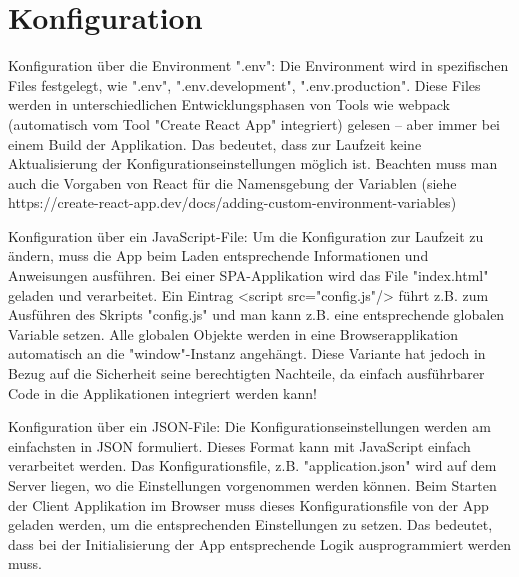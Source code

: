 \section{Konfiguration}

Konfiguration über die Environment ".env": Die Environment wird in spezifischen Files festgelegt, wie ".env", ".env.development", ".env.production". Diese Files werden in unterschiedlichen Entwicklungsphasen von Tools wie webpack (automatisch vom Tool "Create React App" integriert) gelesen – aber immer bei einem Build der Applikation. Das bedeutet, dass zur Laufzeit keine Aktualisierung der Konfigurationseinstellungen möglich ist. Beachten muss man auch die Vorgaben von React für die Namensgebung der Variablen (siehe https://create-react-app.dev/docs/adding-custom-environment-variables)

Konfiguration über ein JavaScript-File: Um die Konfiguration zur Laufzeit zu ändern, muss die App beim Laden entsprechende Informationen und Anweisungen ausführen. Bei einer SPA-Applikation wird das File "index.html" geladen und verarbeitet. Ein Eintrag <script src="config.js"/> führt z.B. zum Ausführen des Skripts "config.js" und man kann z.B. eine entsprechende globalen Variable setzen. Alle globalen Objekte werden in eine Browserapplikation automatisch an die "window"-Instanz angehängt. Diese Variante hat jedoch in Bezug auf die Sicherheit seine berechtigten Nachteile, da einfach ausführbarer Code in die Applikationen integriert werden kann!

Konfiguration über ein JSON-File: Die Konfigurationseinstellungen werden am einfachsten in JSON formuliert. Dieses Format kann mit JavaScript einfach verarbeitet werden. Das Konfigurationsfile, z.B. "application.json" wird auf dem Server liegen, wo die Einstellungen vorgenommen werden können. Beim Starten der Client Applikation im Browser muss dieses Konfigurationsfile von der App geladen werden, um die entsprechenden Einstellungen zu setzen. Das bedeutet, dass bei der Initialisierung der App entsprechende Logik ausprogrammiert werden muss.